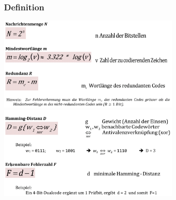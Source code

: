 \vspace{2ex}
\begin{minipage}{9cm}
	\subsubsection{Definition}
		\includegraphics[width=9cm]{pics/2-Fehlererkennung1}\\
		\includegraphics[width=9cm]{pics/2-Fehlererkennung2}
\end{minipage}
%
\begin{minipage}{0.5cm}
	\ \
\end{minipage}
%
